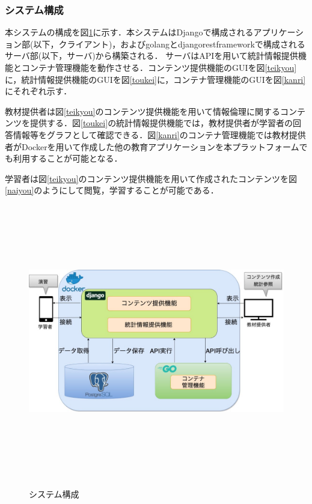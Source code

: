 \subsubsection{システム構成}
本システムの構成を図\ref{system}に示す．本システムはDjangoで構成されるアプリケーション部(以下，クライアント)，およびgolangとdjangorestframeworkで構成されるサーバ部(以下，サーバ)から構築される．
サーバはAPIを用いて統計情報提供機能とコンテナ管理機能を動作させる．コンテンツ提供機能のGUIを図\ref{teikyou}に，統計情報提供機能のGUIを図\ref{toukei}に，コンテナ管理機能のGUIを図\ref{kanri}にそれぞれ示す．

教材提供者は図\ref{teikyou}のコンテンツ提供機能を用いて情報倫理に関するコンテンツを提供する．図\ref{toukei}の統計情報提供機能では，教材提供者が学習者の回答情報等をグラフとして確認できる．図\ref{kanri}のコンテナ管理機能では教材提供者がDockerを用いて作成した他の教育アプリケーションを本プラットフォームでも利用することが可能となる．

学習者は図\ref{teikyou}のコンテンツ提供機能を用いて作成されたコンテンツを図\ref{naiyou}のようにして閲覧，学習することが可能である．

\begin{figure}[htbp]
    \begin{center}
        \includegraphics[width=13cm,height=12cm,keepaspectratio]{system-crop.pdf}\\
    \end{center}
    \caption{システム構成}
    \label{system}
\end{figure}

